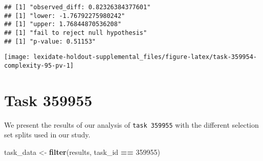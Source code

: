 \documentclass[
]{book}
\newenvironment{Shaded}{\begin{snugshade}}{\end{snugshade}}
\newcommand{\AttributeTok}[1]{\textcolor[rgb]{0.13,0.29,0.53}{#1}}
\newcommand{\DecValTok}[1]{\textcolor[rgb]{0.00,0.00,0.81}{#1}}
\newcommand{\FunctionTok}[1]{\textcolor[rgb]{0.13,0.29,0.53}{\textbf{#1}}}
\newcommand{\NormalTok}[1]{#1}
\newcommand{\OtherTok}[1]{\textcolor[rgb]{0.56,0.35,0.01}{#1}}
\newcommand{\SpecialCharTok}[1]{\textcolor[rgb]{0.81,0.36,0.00}{\textbf{#1}}}
\newcommand{\StringTok}[1]{\textcolor[rgb]{0.31,0.60,0.02}{#1}}
\begin{document}
\begin{Shaded}
\end{Shaded}

\begin{verbatim}
## [1] "observed_diff: 0.82326384377601"
## [1] "lower: -1.76792275980242"
## [1] "upper: 1.76844870536208"
## [1] "fail to reject null hypothesis"
## [1] "p-value: 0.51153"
\end{verbatim}

\texttt{[image: lexidate-holdout-supplemental\_files/figure-latex/task-359954-complexity-95-pv-1]}

\hypertarget{task-359955}{%
\chapter{Task 359955}\label{task-359955}}

We present the results of our analysis of \texttt{task\ 359955} with the different selection set splits used in our study.

\begin{Shaded}
\begin{Highlighting}[]
\NormalTok{task\_data }\OtherTok{\textless{}{-}} \FunctionTok{filter}\NormalTok{(results, task\_id }\SpecialCharTok{==} \DecValTok{359955}\NormalTok{)}
\end{Highlighting}
\end{Shaded}
\end{document}
